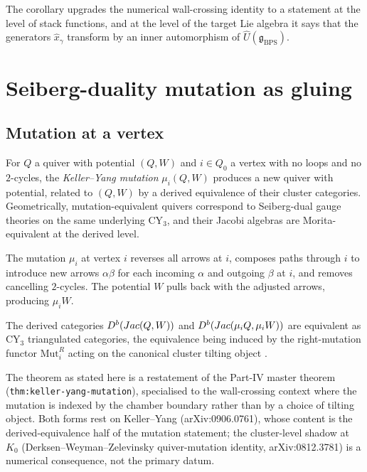 The corollary upgrades the numerical wall-crossing identity to a statement at
the level of stack functions, and at the level of the target Lie algebra it
says that the generators $\hat{x}_\gamma$ transform by an inner automorphism of
$\hat{U}(\mathfrak{g}_{\mathrm{BPS}})$.

\section{Seiberg-duality mutation as gluing}
\label{sec:seiberg-mutation-gluing}

\subsection{Mutation at a vertex}

For $Q$ a quiver with potential $(Q, W)$ and $i \in Q_0$ a vertex with no
loops and no $2$-cycles, the \emph{Keller--Yang mutation} $\mu_i(Q, W)$
produces a new quiver with potential, related to $(Q, W)$ by a derived
equivalence of their cluster categories. Geometrically,
mutation-equivalent quivers correspond to Seiberg-dual gauge theories on the
same underlying CY$_3$, and their Jacobi algebras are Morita-equivalent at
the derived level.

\begin{definition}
  \label{def:quiver-mutation}
  The mutation $\mu_i$ at vertex $i$ reverses all arrows at $i$, composes
  paths through $i$ to introduce new arrows $\alpha \beta$ for each
  incoming $\alpha$ and outgoing $\beta$ at $i$, and removes cancelling
  $2$-cycles. The potential $W$ pulls back with the adjusted arrows,
  producing $\mu_i W$.
\end{definition}

\begin{theorem}
  \label{thm:keller-yang-mutation-wc}
  The derived categories $D^b(Jac(Q, W))$ and $D^b(Jac(\mu_i Q, \mu_i W))$
  are equivalent as CY$_3$ triangulated categories, the equivalence being
  induced by the right-mutation functor $\mathrm{Mut}_i^R$ acting on the
  canonical cluster tilting object \cite{KellerYang2011}.
\end{theorem}

\begin{remark}
  \label{rem:keller-yang-restatement}
  The theorem as stated here is a restatement of the Part-IV master
  theorem (\texttt{thm:keller-yang-mutation}), specialised to the
  wall-crossing context where the mutation is indexed by the chamber
  boundary rather than by a choice of tilting object. Both forms rest
  on Keller--Yang \cite{KellerYang2011} (arXiv:0906.0761), whose content
  is the derived-equivalence half of the mutation statement; the
  cluster-level shadow at $K_0$ (Derksen--Weyman--Zelevinsky quiver-mutation
  identity, arXiv:0812.3781) is a numerical consequence, not the
  primary datum.
\end{remark}

